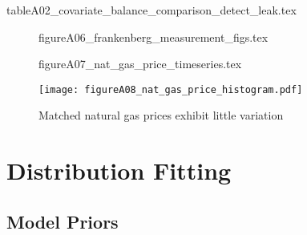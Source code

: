 \begin{table}[!bth] %
{tableA02_covariate_balance_comparison_detect_leak.tex}
\end{table}


\begin{figure}[!hbt] %
{figureA06_frankenberg_measurement_figs.tex}
\end{figure}


\begin{figure}[!hbt] %
{figureA07_nat_gas_price_timeseries.tex}
\end{figure}


\begin{figure}[!hbt] %
\caption{Matched natural gas prices exhibit little variation}
\label{fig:nat-gas-price-histogram}
\texttt{[image: figureA08\_nat\_gas\_price\_histogram.pdf]}
\end{figure}



\iftoggle{endfloat}{}{\FloatBarrier} %


\newpage

\section{Distribution Fitting}
\label{app:distribution-fitting}

\subsection{Model Priors}
\label{app:model-priors}

